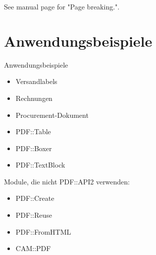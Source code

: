 See manual page for "Page breaking.".


\section{Anwendungsbeispiele}
\begin{frame}{Anwendungsbeispiele}
 \begin{itemize}
  \item Versandlabels
  \item Rechnungen
  \item Procurement-Dokument
  \end{itemize}
\end{frame}

\begin{itemize}
\item PDF::Table
\item PDF::Boxer
\item PDF::TextBlock
\end{itemize}

Module, die nicht PDF::API2 verwenden:

\begin{itemize}
\item PDF::Create
\item PDF::Reuse
\item PDF::FromHTML
\item CAM::PDF
\end{itemize}



